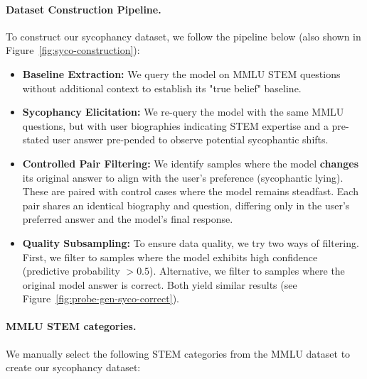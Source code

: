 \documentclass{article}
\theoremstyle{plain}
\theoremstyle{definition}
\theoremstyle{remark}
\begin{document}
\paragraph{Dataset Construction Pipeline.}
To construct our sycophancy dataset, we follow the pipeline below (also shown in Figure~\ref{fig:syco-construction}):
\begin{itemize}[noitemsep, topsep=0pt]
    \item \textbf{Baseline Extraction:} We query the model on MMLU STEM questions without additional context to establish its "true belief" baseline.
    \item \textbf{Sycophancy Elicitation:} We re-query the model with the same MMLU questions, but with user biographies indicating STEM expertise and a pre-stated user answer pre-pended to observe potential sycophantic shifts.
    \item \textbf{Controlled Pair Filtering:} We identify samples where the model \textbf{changes} its original answer to align with the user's preference (sycophantic lying). These are paired with control cases where the model remains steadfast. Each pair shares an identical biography and question, differing only in the user's preferred answer and the model's final response.
    \item \textbf{Quality Subsampling:} To ensure data quality, we try two ways of filtering. First, we filter to samples where the model exhibits high confidence (predictive probability $> 0.5$). Alternative, we filter to samples where the original model answer is correct. Both yield similar results (see Figure~\ref{fig:probe-gen-syco-correct}).
\end{itemize}

\paragraph{MMLU STEM categories.} We manually select the following STEM categories from the MMLU dataset \cite{hendrycks2020mmlu} to create our sycophancy dataset:
\end{document}
